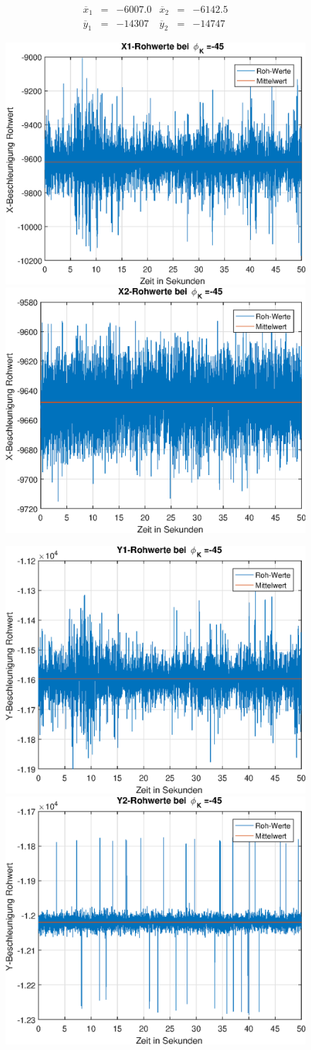 \documentclass{article}
\begin{document}
\begin{equation}
\begin{array}{lclclcl}
\overline{x}_1 &=& -6007.0 & \overline{x}_2 &=& -6142.5 \\
\overline{y}_1 &=& -14307 & \overline{y}_2 &=& -14747
\end{array}
\end{equation}
\newpage
\begin{figure}[h]
	\includegraphics[width=0.5\linewidth]{img/phiK-45_x1_raw.eps}
	\includegraphics[width=0.5\linewidth]{img/phiK-45_x2_raw.eps}
\end{figure}
\begin{figure}[h]
	\includegraphics[width=0.5\linewidth]{img/phiK-45_y1_raw.eps}
	\includegraphics[width=0.5\linewidth]{img/phiK-45_y2_raw.eps}
\end{figure}
\end{document}
